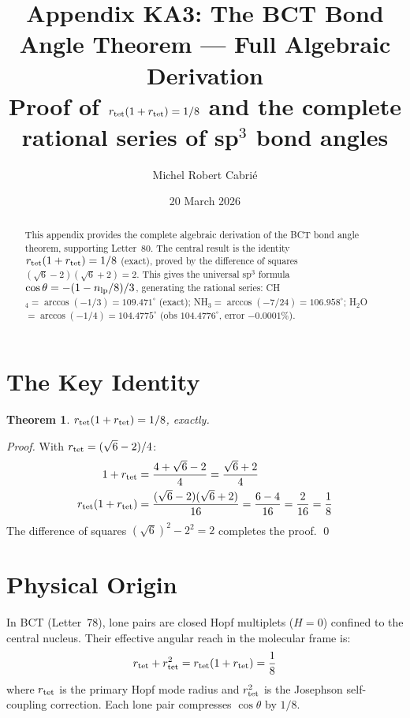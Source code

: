 \documentclass[aps,prl,twocolumn,showpacs,superscriptaddress]{revtex4-2}
\newtheorem{theorem}{Theorem}
\begin{document}
\title{Appendix KA3: The BCT Bond Angle Theorem --- Full Algebraic Derivation\\
Proof of $r_{\rm tet}(1+r_{\rm tet})=1/8$ and the complete rational
series of sp$^3$ bond angles}

\author{Michel Robert Cabri\'e}
\date{20 March 2026}

\begin{abstract}
This appendix provides the complete algebraic derivation of the BCT 
bond angle theorem, supporting Letter~80. The central result is the 
identity $r_{\rm tet}(1+r_{\rm tet}) = 1/8$ (exact), proved by the 
difference of squares $(\sqrt{6}-2)(\sqrt{6}+2) = 2$. This gives 
the universal sp$^3$ formula $\cos\theta = -(1-n_{\rm lp}/8)/3$, 
generating the rational series: CH$_4 = \arccos(-1/3) = 109.471^\circ$ 
(exact); NH$_3 = \arccos(-7/24) = 106.958^\circ$; 
H$_2$O $= \arccos(-1/4) = 104.4775^\circ$ (obs $104.4776^\circ$, 
error $-0.0001\%$).
\end{abstract}

\maketitle

\section{The Key Identity}

\begin{theorem}
$r_{\rm tet}(1+r_{\rm tet}) = 1/8$, exactly.
\end{theorem}

\begin{proof}
With $r_{\rm tet} = (\sqrt{6}-2)/4$:
\begin{align}
1 + r_{\rm tet} &= \frac{4+\sqrt{6}-2}{4} = \frac{\sqrt{6}+2}{4}\\
r_{\rm tet}(1+r_{\rm tet}) &= \frac{(\sqrt{6}-2)(\sqrt{6}+2)}{16}
= \frac{6-4}{16} = \frac{2}{16} = \frac{1}{8}
\end{align}
The difference of squares $(\sqrt{6})^2 - 2^2 = 2$ completes 
the proof. \qed
\end{proof}

\section{Physical Origin}

In BCT (Letter~78), lone pairs are closed Hopf multiplets ($H=0$) 
confined to the central nucleus. Their effective angular reach in 
the molecular frame is:
\begin{equation}
    r_{\rm tet} + r_{\rm tet}^2 = r_{\rm tet}(1+r_{\rm tet}) = \frac{1}{8}
\end{equation}
where $r_{\rm tet}$ is the primary Hopf mode radius and $r_{\rm tet}^2$ 
is the Josephson self-coupling correction. Each lone pair compresses 
$\cos\theta$ by $1/8$.
\end{document}
